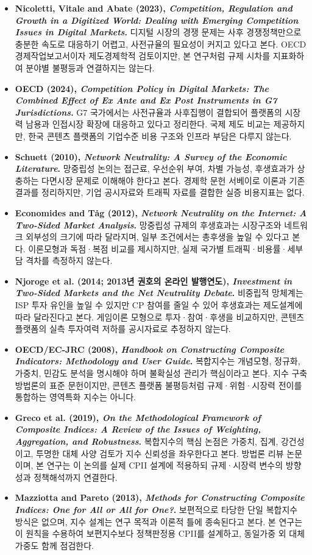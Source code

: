 \documentclass[11pt,a4paper]{report}
\begin{document}
\begin{itemize}[leftmargin=*, itemsep=0.5em]
  \item \textbf{Nicoletti, Vitale and Abate (2023), \textit{Competition, Regulation and Growth in a Digitized World: Dealing with Emerging Competition Issues in Digital Markets}.} 디지털 시장의 경쟁 문제는 사후 경쟁정책만으로 충분한 속도로 대응하기 어렵고, 사전규율의 필요성이 커지고 있다고 본다. OECD 경제작업보고서이자 제도경제학적 검토이지만, 본 연구처럼 규제 시차를 지표화하여 분야별 불평등과 연결하지는 않는다.
  \item \textbf{OECD (2024), \textit{Competition Policy in Digital Markets: The Combined Effect of Ex Ante and Ex Post Instruments in G7 Jurisdictions}.} G7 국가에서는 사전규율과 사후집행이 결합되어 플랫폼의 시장력 남용과 인접시장 확장에 대응하고 있다고 정리한다. 국제 제도 비교는 제공하지만, 한국 콘텐츠 플랫폼의 기업수준 비용 구조와 인프라 부담은 다루지 않는다.
  \item \textbf{Schuett (2010), \textit{Network Neutrality: A Survey of the Economic Literature}.} 망중립성 논의는 접근료, 우선순위 부여, 차별 가능성, 후생효과가 상충하는 다면시장 문제로 이해해야 한다고 본다. 경제학 문헌 서베이로 이론과 기존 결과를 정리하지만, 기업 공시자료와 트래픽 자료를 결합한 실증 비용지표는 없다.
  \item \textbf{Economides and T\r{a}g (2012), \textit{Network Neutrality on the Internet: A Two-Sided Market Analysis}.} 망중립성 규제의 후생효과는 시장구조와 네트워크 외부성의 크기에 따라 달라지며, 일부 조건에서는 총후생을 높일 수 있다고 본다. 이론모형과 독점·복점 비교를 제시하지만, 실제 국가별 트래픽·비용률·세부담 격차를 측정하지 않는다.
  \item \textbf{Njoroge et al. (2014; 2013년 권호의 온라인 발행연도), \textit{Investment in Two-Sided Markets and the Net Neutrality Debate}.} 비중립적 망체계는 ISP 투자 유인을 높일 수 있지만 CP 참여를 줄일 수 있어 후생효과는 제도설계에 따라 달라진다고 본다. 게임이론 모형으로 투자·참여·후생을 비교하지만, 콘텐츠 플랫폼의 실측 투자여력 저하를 공시자료로 추정하지 않는다.
  \item \textbf{OECD/EC-JRC (2008), \textit{Handbook on Constructing Composite Indicators: Methodology and User Guide}.} 복합지수는 개념모형, 정규화, 가중치, 민감도 분석을 명시해야 하며 불확실성 관리가 핵심이라고 본다. 지수 구축 방법론의 표준 문헌이지만, 콘텐츠 플랫폼 불평등처럼 규제·위험·시장력 전이를 통합하는 영역특화 지수는 아니다.
  \item \textbf{Greco et al. (2019), \textit{On the Methodological Framework of Composite Indices: A Review of the Issues of Weighting, Aggregation, and Robustness}.} 복합지수의 핵심 논점은 가중치, 집계, 강건성이고, 투명한 대체 사양 검토가 지수 신뢰성을 좌우한다고 본다. 방법론 리뷰 논문이며, 본 연구는 이 논의를 실제 CPII 설계에 적용하되 규제·시장력 변수의 방향성과 정책해석까지 연결한다.
  \item \textbf{Mazziotta and Pareto (2013), \textit{Methods for Constructing Composite Indices: One for All or All for One?}.} 보편적으로 타당한 단일 복합지수 방식은 없으며, 지수 설계는 연구 목적과 이론적 틀에 종속된다고 본다. 본 연구는 이 원칙을 수용하여 보편지수보다 정책판정용 CPII를 설계하고, 동일가중 외 대체 가중도 함께 점검한다.
\end{itemize}
\normalsize
\end{document}
